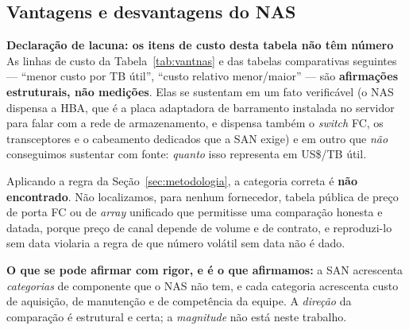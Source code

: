 \documentclass[11pt,a4paper]{article}
\newcommand{\correcao}[2]{%
  \begin{center}\begin{minipage}{0.96\textwidth}
  \colorbox{fundo}{\begin{minipage}{\dimexpr\linewidth-2\fboxsep}
  \vspace{2pt}\textbf{\color{laranja}\small #1}\\[1pt]\footnotesize #2\vspace{3pt}
  \end{minipage}}\end{minipage}\end{center}}
\begin{document}
\subsection{Vantagens e desvantagens do NAS}
\label{sec:vantnas}

\correcao{Declaração de lacuna: os itens de custo desta tabela não têm número}{%
As linhas de custo da Tabela~\ref{tab:vantnas} e das tabelas comparativas seguintes ---
``menor custo por TB útil'', ``custo relativo menor/maior'' --- são \textbf{afirmações estruturais,
não medições}. Elas se sustentam em um fato verificável (o NAS dispensa a HBA, que é a placa adaptadora de
barramento instalada no servidor para falar com a rede de armazenamento, e dispensa também o
\textit{switch} FC, os transceptores e o cabeamento dedicados que a SAN exige) e em outro que \emph{não} conseguimos
sustentar com fonte: \emph{quanto} isso representa em US\$/TB útil.

\smallskip
Aplicando a regra da Seção~\ref{sec:metodologia}, a categoria correta é \textbf{não encontrado}.
Não localizamos, para nenhum fornecedor, tabela pública de preço de porta FC ou de \textit{array}
unificado que permitisse uma comparação honesta e datada, porque preço de canal depende de volume e
de contrato, e reproduzi-lo sem data violaria a regra de que número volátil sem data não é dado.

\smallskip
\textbf{O que se pode afirmar com rigor, e é o que afirmamos:} a SAN acrescenta \emph{categorias} de
componente que o NAS não tem, e cada categoria acrescenta custo de aquisição, de manutenção e de
competência da equipe. A \emph{direção} da comparação é estrutural e certa; a \emph{magnitude} não
está neste trabalho.}
\end{document}

